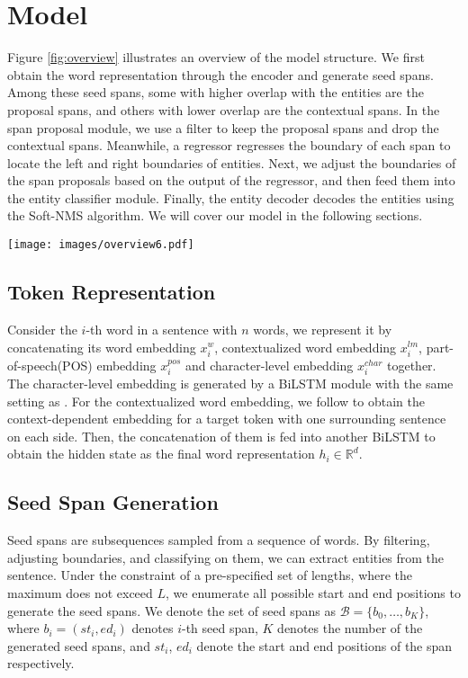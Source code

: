 \documentclass[11pt,a4paper]{article}
\begin{document}
\section{Model}
Figure \ref{fig:overview} illustrates an overview of the model structure. We first obtain the word representation through the encoder and generate seed spans. Among these seed spans, some with higher overlap with the entities are the proposal spans, and others with lower overlap are the contextual spans. In the span proposal module, we use a filter to keep the proposal spans and drop the contextual spans. Meanwhile, a regressor regresses the boundary of each span to locate the left and right boundaries of entities. Next, we adjust the boundaries of the span proposals based on the output of the regressor, and then feed them into the entity classifier module. Finally, the entity decoder decodes the entities using the Soft-NMS algorithm. We will cover our model in the following sections.

\begin{figure*}[h]
  \centering
  \texttt{[image: images/overview6.pdf]}
  \caption{The overall architecture of the Two-stage Identifier. }
   \label{fig:overview}
\end{figure*}

\subsection{Token Representation}

Consider the $i$-th word in a sentence with $n$ words, we represent it by concatenating its word embedding $x^{w}_i$, contextualized word embedding $x^{lm}_i$, part-of-speech(POS) embedding $x^{pos}_i$ and character-level embedding $x^{char}_i$ together. The character-level embedding is generated by a BiLSTM module with the same setting as \citep{ju-etal-2018-neural}.
For the contextualized word embedding, we follow \citep{yu-etal-2020-named} to obtain the context-dependent embedding for a target token with one surrounding sentence on each side. Then, the concatenation of them is fed into another BiLSTM to obtain the hidden state as the final word representation $h_i\in \mathbb{R}^d$.

\subsection{Seed Span Generation}

Seed spans are subsequences sampled from a sequence of words. By filtering, adjusting boundaries, and classifying on them, we can extract entities from the sentence. Under the constraint of a pre-specified set of lengths, where the maximum does not exceed $L$, we enumerate all possible start and end positions to generate the seed spans. We denote the set of seed spans as $\mathcal{B}=\{b_0, \dots, b_K\}$, where $b_i = (st_i, ed_i)$ denotes $i$-th seed span, $K$ denotes the number of the generated seed spans, and $st_i$, $ed_i$ denote the start and end positions of the span respectively.
\end{document}
